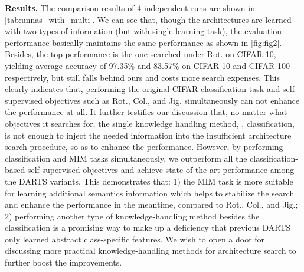\documentclass[10pt,twocolumn,letterpaper]{article}
\newcommand{\mypara}[1]{\vspace{1mm}\noindent\textbf{#1}}
\begin{document}
\mypara{Results.}
The comparison results of 4 independent runs are shown in \cref{tab:unnas_with_multi}.
We can see that, though the architectures are learned with two types of information (but with single learning task), the evaluation performance basically maintains the same performance as shown in \cref{fig:fig2}.
Besides, the top performance is the one searched under Rot. on CIFAR-10, yielding average accuracy of 97.35\% and 83.57\% on CIFAR-10 and CIFAR-100 respectively, but still falls behind ours and costs more search expenses.
This clearly indicates that, performing the original CIFAR classification task and self-supervised objectives such as Rot., Col., and Jig. simultaneously can not enhance the performance at all.
It further testifies our discussion that, no matter what objectives it searches for, the single knowledge handling method, \ie, classification, is not enough to inject the needed information into the insufficient architecture search procedure,
so as to enhance the performance.
However, by performing classification and MIM tasks simultaneously, we outperform all the classification-based self-supervised objectives and achieve state-of-the-art performance among the DARTS variants.
This demonstrates that:
1) the MIM task is more suitable for learning additional semantics information which helps to stabilize the search and enhance the performance in the meantime, compared to Rot., Col., and Jig.;
2) performing another type of knowledge-handling method besides the classification is a promising way to make up a deficiency that previous DARTS only learned abstract class-specific features.
We wish to open a door for discussing more practical knowledge-handling methods for architecture search to further boost the improvements.
\end{document}
